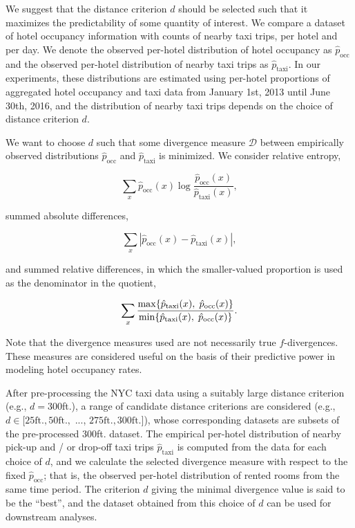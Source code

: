 \documentclass[useAMS, usenatbib]{biom}
\begin{document}
We suggest that the distance criterion $d$ should be selected such that it maximizes the predictability of some quantity of interest. We compare a dataset of hotel occupancy information with counts of nearby taxi trips, per hotel and per day. We denote the observed per-hotel distribution of hotel occupancy as $\hat{p}_{\mathrm{occ}}$ and the observed per-hotel distribution of nearby taxi trips as $\hat{p}_{\mathrm{taxi}}$. In our experiments, these distributions are estimated using per-hotel proportions of aggregated hotel occupancy and taxi data from January 1st, 2013 until June 30th, 2016, and the distribution of nearby taxi trips depends on the choice of distance criterion $d$.

We want to choose $d$ such that some divergence measure $\mathcal{D}$ between empirically observed distributions $\hat{p}_{\mathrm{occ}}$ and $\hat{p}_{\mathrm{taxi}}$ is minimized. We consider relative entropy,

$$\sum_x \hat{p}_{\mathrm{occ}} (x) \log \frac{\hat{p}_{\mathrm{occ}} (x)}{\hat{p}_{\mathrm{taxi}} (x)},$$

summed absolute differences,

$$\sum_x | \hat{p}_{\mathrm{occ}} (x) - \hat{p}_{\mathrm{taxi}} (x) |,$$

and summed relative differences, in which the smaller-valued proportion is used as the denominator in the quotient,

$$\sum_x \frac{\max \{ \hat{p}_{\mathrm{taxi}} (x), \hspace*{0.1cm} \hat{p}_{\mathrm{occ}} (x) \}}{\min \{ \hat{p}_{\mathrm{taxi}} (x), \hspace*{0.1cm} \hat{p}_{\mathrm{occ}} (x) \}}.$$

Note that the divergence measures used are not necessarily true $f$-divergences. These measures are considered useful on the basis of their predictive power in modeling hotel occupancy rates.

After pre-processing the NYC taxi data using a suitably large distance criterion (e.g., $d = 300$ft.), a range of candidate distance criterions are considered (e.g., $d \in [25 \mathrm{ft.}, 50 \mathrm{ft.},$ ..., $275 \mathrm{ft.}, 300 \mathrm{ft.}]$), whose corresponding datasets are subsets of the pre-processed 300ft. dataset. The empirical per-hotel distribution of nearby pick-up and / or drop-off taxi trips $\hat{p}_{\mathrm{taxi}}$ is computed from the data for each choice of $d$, and we calculate the selected divergence measure with respect to the fixed $\hat{p}_{\mathrm{occ}}$; that is, the observed per-hotel distribution of rented rooms from the same time period. The criterion $d$ giving the minimal divergence value is said to be the ``best'', and the dataset obtained from this choice of $d$ can be used for downstream analyses.
\end{document}
